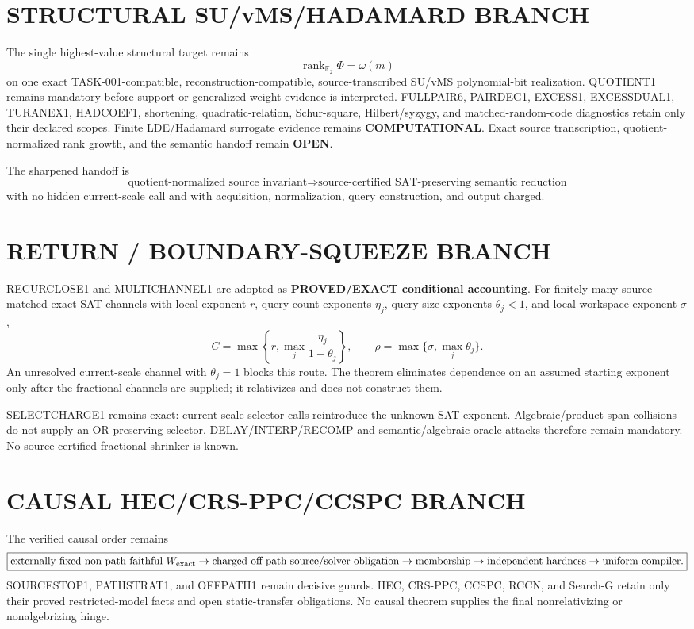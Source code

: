 \documentclass[11pt]{article}
\begin{document}
\section*{STRUCTURAL SU/vMS/HADAMARD BRANCH}
The single highest-value structural target remains
\[
\boxed{\operatorname{rank}_{\mathbb F_2}\Phi=\omega(m)}
\]
on one exact TASK-001-compatible, reconstruction-compatible, source-transcribed SU/vMS polynomial-bit realization. QUOTIENT1 remains mandatory before support or generalized-weight evidence is interpreted. FULLPAIR6, PAIRDEG1, EXCESS1, EXCESSDUAL1, TURANEX1, HADCOEF1, shortening, quadratic-relation, Schur-square, Hilbert/syzygy, and matched-random-code diagnostics retain only their declared scopes. Finite LDE/Hadamard surrogate evidence remains \textbf{COMPUTATIONAL}. Exact source transcription, quotient-normalized rank growth, and the semantic handoff remain \textbf{OPEN}.

The sharpened handoff is
\[
\boxed{\text{quotient-normalized source invariant}\Longrightarrow
\text{source-certified SAT-preserving semantic reduction}}
\]
with no hidden current-scale call and with acquisition, normalization, query construction, and output charged.

\section*{RETURN / BOUNDARY-SQUEEZE BRANCH}
RECURCLOSE1 and MULTICHANNEL1 are adopted as \textbf{PROVED/EXACT conditional accounting}. For finitely many source-matched exact SAT channels with local exponent $r$, query-count exponents $\eta_j$, query-size exponents $\theta_j<1$, and local workspace exponent $\sigma$,
\[
C=\max\left\{r,\max_j\frac{\eta_j}{1-\theta_j}\right\},
\qquad
\rho=\max\{\sigma,\max_j\theta_j\}.
\]
An unresolved current-scale channel with $\theta_j=1$ blocks this route. The theorem eliminates dependence on an assumed starting exponent only after the fractional channels are supplied; it relativizes and does not construct them.

SELECTCHARGE1 remains exact: current-scale selector calls reintroduce the unknown SAT exponent. Algebraic/product-span collisions do not supply an OR-preserving selector. DELAY/INTERP/RECOMP and semantic/algebraic-oracle attacks therefore remain mandatory. No source-certified fractional shrinker is known.

\section*{CAUSAL HEC/CRS-PPC/CCSPC BRANCH}
The verified causal order remains
\[
\boxed{
\text{externally fixed non-path-faithful }W_{\rm exact}
\to
\text{charged off-path source/solver obligation}
\to
\text{membership}
\to
\text{independent hardness}
\to
\text{uniform compiler}.}
\]
SOURCESTOP1, PATHSTRAT1, and OFFPATH1 remain decisive guards. HEC, CRS-PPC, CCSPC, RCCN, and Search-G retain only their proved restricted-model facts and open static-transfer obligations. No causal theorem supplies the final nonrelativizing or nonalgebrizing hinge.
\end{document}
